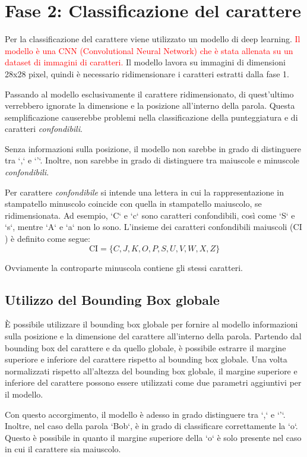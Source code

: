 \section{Fase 2: Classificazione del carattere}

Per la classificazione del carattere viene utilizzato un modello di deep learning. \textcolor{red}{Il modello è una CNN (Convolutional Neural Network) che è stata allenata su un dataset di immagini di caratteri.}
Il modello lavora su immagini di dimensioni 28x28 pixel, quindi è necessario ridimensionare i caratteri estratti dalla fase 1.


Passando al modello esclusivamente il carattere ridimensionato, di quest'ultimo verrebbero ignorate la dimensione e la posizione all'interno della parola. Questa semplificazione causerebbe problemi nella classificazione della punteggiatura e di caratteri \emph{confondibili}.

Senza informazioni sulla posizione, il modello non sarebbe in grado di distinguere tra `,` e `'`. Inoltre, non sarebbe in grado di distinguere tra maiuscole e minuscole \emph{confondibili}.
\newline

Per carattere \emph{confondibile} si intende una lettera in cui la rappresentazione in stampatello minuscolo coincide con quella in stampatello maiuscolo, se ridimensionata. Ad esempio, `C` e `c` sono caratteri confondibili, così come `S` e `s`, mentre `A` e `a` non lo sono.
L'insieme dei caratteri confondibili maiuscoli ($\text{CI}$) è definito come segue:
$$\text{CI} = \{C, J, K, O, P, S, U, V, W, X, Z\}$$

Ovviamente la controparte minuscola contiene gli stessi caratteri.

\subsection{Utilizzo del Bounding Box globale}

È possibile utilizzare il bounding box globale per fornire al modello informazioni sulla posizione e la dimensione del carattere all'interno della parola. Partendo dal bounding box del carattere e da quello globale, è possibile estrarre il margine superiore e inferiore del carattere rispetto al bounding box globale. Una volta normalizzati rispetto all'altezza del bounding box globale, il margine superiore e inferiore del carattere possono essere utilizzati come due parametri aggiuntivi per il modello.

Con questo accorgimento, il modello è adesso in grado distinguere tra `,` e `'`. Inoltre, nel caso della parola `Bob`, è in grado di classificare correttamente la `o`. Questo è possibile in quanto il margine superiore della `o` è solo presente nel caso in cui il carattere sia maiuscolo.

